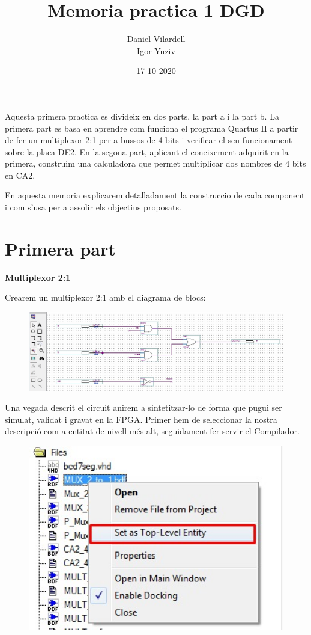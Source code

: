 \documentclass[12pt, a4papre]{article}
\author{Daniel Vilardell\\
	   Igor Yuziv}
\title{Memoria practica 1 DGD}
\date{17-10-2020}
\begin{document}
	\maketitle
	Aquesta primera practica es divideix en dos parts, la part a i la part b. La primera part es basa en aprendre com funciona el programa Quartus II a partir de fer un multiplexor  2:1 per a bussos de 4 bits i verificar el seu funcionament sobre la placa DE2. En la segona part, aplicant el coneixement adquirit en la primera, construim una calculadora que permet multiplicar dos nombres de 4 bits en CA2.
	
	En aquesta memoria explicarem detalladament la construccio de cada component i com s'usa per a assolir els objectius proposats.

	\newpage
	\section{Primera part}
	\textbf{\large{Multiplexor 2:1}}
	
	Crearem un multiplexor 2:1 amb el diagrama de blocs:
	\begin{figure}[H]
		\begin{center}
		\includegraphics[width=150mm]{multiplexor2_1.jpeg}
		\end{center}
	\end{figure}
	
	Una vegada descrit el circuit anirem a sintetitzar-lo de forma que pugui ser
simulat, validat i gravat en la FPGA. Primer hem de seleccionar la nostra descripció com a entitat de nivell més alt, seguidament fer servir el Compilador.
		\begin{figure}[H]
		\begin{center}
		\includegraphics[width=150mm]{top_entity.jpeg}
		\end{center}
	\end{figure}
	
\end{document}

